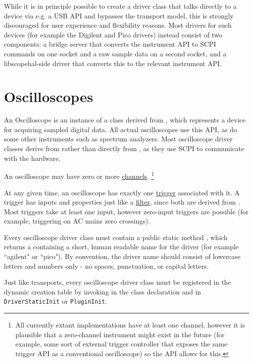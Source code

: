 While it is in principle possible to create a driver class that talks directly to a device via e.g. a USB API and
bypasses the transport model, this is strongly discouraged for user experience and flexibility reasons. Most drivers
for such devices (for example the Digilent and Pico drivers) instead consist of two components: a bridge server that
converts the instrument API to SCPI commands on one socket and a raw sample data on a second socket, and a
libscopehal-side driver that converts this to the relevant instrument API.

\section{Oscilloscopes}
\label{sec:oscilloscopes}

An Oscilloscope is an instance of a class derived from , which represents a device for
acquiring sampled digital data. All actual oscilloscopes use this API, as do some other instruments such as spectrum
analyzers. Most oscilloscope driver classes derive from  rather than directly from
, as they use SCPI to communicate with the hardware.

An oscilloscope may have zero or more \hyperref[sec:channels]{channels}. \footnote{All currently extant implementations
have at least one channel, however it is plausible that a zero-channel instrument might exist in the future (for
example, some sort of external trigger controller that exposes the same trigger API as a conventional oscilloscope) so
the API allows for this.}

At any given time, an oscilloscope has exactly one \hyperref[sec:triggers]{trigger} associated with it. A trigger has
inputs and properties just like a \hyperref[sec:filters]{filter}, since both are derived from
. Most triggers take at least one input, however zero-input triggers are possible (for
example, triggering on AC mains zero crossings).

Every oscilloscope driver class must contain a public static method , which returns a
 containing a short, human readable name for the driver (for example ``agilent" or ``pico"). By
convention, the driver name should consist of lowercase letters and numbers only - no spaces, punctuation, or capital
letters.

Just like transports, every oscilloscope driver class must be registered in the dynamic creation table by invoking
 in the class declaration and
 in \texttt{DriverStaticInit} or \texttt{PluginInit}.

